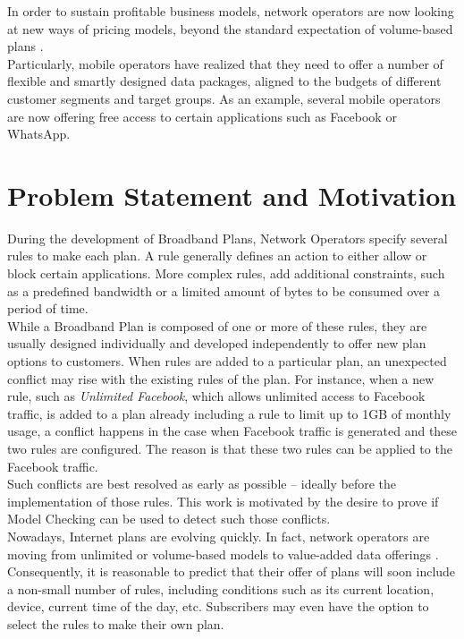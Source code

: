 In order to sustain profitable business models, network operators are now looking at new ways of pricing models, beyond the standard expectation of volume-based plans \cite{Sen2013}. \\

Particularly, mobile operators have realized that they need to offer a number of flexible and smartly designed data packages, aligned to the budgets of different customer segments and target groups. As an example, several mobile operators are now offering free access to certain applications such as Facebook or WhatsApp. \\

\section{Problem Statement and Motivation}
\noindent
During the development of Broadband Plans, Network Operators specify several rules to make each plan. A rule generally defines an action to either allow or block certain applications. More complex rules, add additional constraints, such as a predefined bandwidth or a limited amount of bytes to be consumed over a period of time. \\

While a Broadband Plan is composed of one or more of these rules, they are usually designed individually and developed independently to offer new plan options to customers. When rules are added to a particular plan, an unexpected conflict may rise with the existing rules of the plan. For instance, when a new rule, such as \textit{Unlimited Facebook}, which allows unlimited access to Facebook traffic, is added to a plan already including a rule to limit up to 1GB of monthly usage, a conflict happens in the case when Facebook traffic is generated and these two rules are configured. The reason is that these two rules can be applied to the Facebook traffic. \\
	
Such conflicts are best resolved as early as possible -- ideally before the implementation of those rules. This work is motivated by the desire to prove if Model Checking can be used to detect such those conflicts. \\

Nowadays, Internet plans are evolving quickly. In fact, network operators are moving from unlimited or volume-based models to value-added data offerings \cite{Sen2013,Kimbler2012}. Consequently, it is reasonable to predict that their offer of plans will soon include a non-small number of rules, including conditions such as its current location, device, current time of the day, etc. Subscribers may even have the option to select the rules to make their own plan. \\

